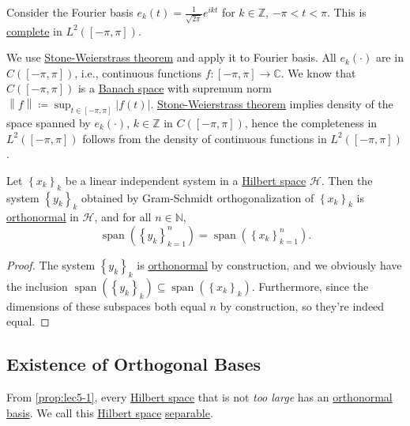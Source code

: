 \begin{eg}
	Consider the Fourier basis \(e_k (t) = \frac{1}{\sqrt{2\pi }} e^{ikt}\) for \(k\in \mathbb{Z } \), \(-\pi < t < \pi \). This is \hyperref[def:complete-system]{complete} in \(L^2([-\pi , \pi ])\).
\end{eg}
\begin{explanation}
	We use \href{https://en.wikipedia.org/wiki/Stone%E2%80%93Weierstrass_theorem}{Stone-Weierstrass theorem} and apply it to Fourier basis. All \(e_k(\cdot)\) are in \(C([-\pi , \pi ])\), i.e., continuous functions \(f\colon [-\pi , \pi ]\to \mathbb{C} \). We know that \(C([-\pi , \pi ])\) is a \hyperref[def:Banach-space]{Banach space} with supremum norm \(\left\lVert f\right\rVert \coloneqq \sup _{t\in [-\pi, \pi ]}\left\vert f(t) \right\vert\). \href{https://en.wikipedia.org/wiki/Stone%E2%80%93Weierstrass_theorem}{Stone-Weierstrass theorem} implies density of the space spanned by \(e_k(\cdot)\), \(k\in \mathbb{Z } \) in \(C([-\pi , \pi ])\), hence the completeness in \(L^2([-\pi , \pi ])\) follows from the density of continuous functions in \(L^2([-\pi , \pi ])\). 
\end{explanation}

\begin{proposition}\label{prop:lec5-1}
	Let \(\left\{ x_k \right\} _k\) be a linear independent system in a \hyperref[def:Hilbert-space]{Hilbert space} \(\mathcal{H}\). Then the system \(\left\{ y_k \right\} _k\) obtained by Gram-Schmidt orthogonalization of \(\left\{ x_k \right\} _k\) is \hyperref[def:orthonormal-system]{orthonormal} in \(\mathcal{H} \), and for all \(n \in \mathbb{N}\),
	\[
		\mathop{\mathrm{span}}(\left\{ y_k \right\} _{k=1}^n) = \mathop{\mathrm{span}}(\left\{ x_k \right\} _{k=1}^n).
	\]
\end{proposition}
\begin{proof}
	The system \(\left\{ y_k \right\} _k\) is \hyperref[def:orthonormal-system]{orthonormal} by construction, and we obviously have the inclusion \(\mathop{\mathrm{span}}(\left\{ y_k \right\} _k) \subseteq \mathop{\mathrm{span}}(\left\{ x_k \right\} _k)\). Furthermore, since the dimensions of these subspaces both equal \(n\) by construction, so they're indeed equal.
\end{proof}

\subsection{Existence of Orthogonal Bases}
From \autoref{prop:lec5-1}, every \hyperref[def:Hilbert-space]{Hilbert space} that is not \emph{too large} has an \hyperref[def:orthonormal-basis]{orthonormal basis}. We call this \hyperref[def:Hilbert-space]{Hilbert space} \hyperref[def:separable]{separable}.

